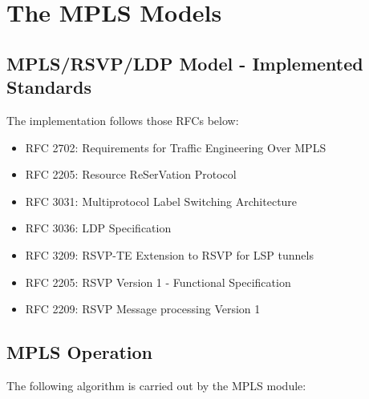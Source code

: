 \chapter{The MPLS Models}
\label{cha:mpls}


\iffalse TODO
\section{Overview}

Blah blah blah
\fi


\section{MPLS/RSVP/LDP Model - Implemented Standards}

The implementation follows those RFCs below:

\begin{itemize}
  \item RFC 2702: Requirements for Traffic Engineering Over MPLS
  \item RFC 2205: Resource ReSerVation Protocol
  \item RFC 3031: Multiprotocol Label Switching Architecture
  \item RFC 3036: LDP Specification
  \item RFC 3209: RSVP-TE Extension to RSVP for LSP tunnels
  \item RFC 2205: RSVP Version 1 - Functional Specification
  \item RFC 2209: RSVP Message processing Version 1
\end{itemize}

\section{MPLS Operation}

The following algorithm is carried out by the MPLS module:

